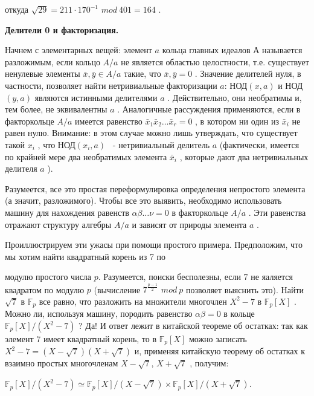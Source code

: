 \documentclass{mai_book}
\begin{document}
откуда $\sqrt{29}=211\cdot 170^{-1}$ $mod \ 401=164$
.


{\bf Делители 0 и факторизация.}

Начнем с элементарных вещей: элемент $a$
 кольца главных идеалов $А$ называется разложимым, если кольцо $A/a$
 не является областью целостности, т.е. существует ненулевые элементы $\bar x,\bar y\in A/ a$
 такие, что $\bar x,\bar y = 0$
 . Значение делителей нуля, в частности, позволяет найти нетривиальные факторизации $a$: НОД$(x,a)$
 и НОД$(y,a)$
 являются истинными делителями $a$
 . Действительно, они необратимы и, тем более, не эквивалентны $a$
. Аналогичные рассуждения применяются, если в факторкольце $A/a$
 имеется равенство $\bar x_1\bar x_2\ldots \bar x_r = 0$
 , в котором ни один из $\bar x_i$
 не равен нулю. Внимание: в этом случае можно лишь утверждать, что существует такой $x_i$
 , что НОД$(x_i,a)$
 ~- нетривиальный делитель $a$
 (фактически, имеется по крайней мере два необратимых элемента $\bar x_i$
    , которые дают два нетривиальных делителя $a$
).

Разумеется, все это простая переформулировка определения непростого элемента (а значит, разложимого). Чтобы все это выявить, необходимо использовать машину для нахождения равенств $\alpha\beta\ldots\nu=0$
 в факторкольце $A/a$
 . Эти равенства отражают структуру алгебры $A/a$
 и зависят от природы элемента $a$
 .

Проиллюстрируем эти ужасы при помощи простого примера. Предположим, что мы хотим найти квадратный корень из 7 по

\newpage

модулю простого числа $p$. Разумеется, поиски бесполезны, если 7 не яаляется квадратом по модулю $p$ (вычисление $7^{\frac{p-1}{2}}$ $mod \ p$
 позволяет выяснить это). Найти $\sqrt 7$
 в $\mathbb{F}_p$
 все равно, что разложить на множители многочлен $X^2 - 7$
 в $\mathbb{F}_p[X]$
 . Можно ли, используя машину, породить равенство $\alpha\beta=0$
 в кольце $\mathbb{F}_p[X]/(X^2 - 7)$
 ? Да! И ответ лежит в китайской теореме об остатках: так как элемент 7 имеет квадратный корень, то в $\mathbb{F}_p[X]$
 можно записать $X^2 - 7 = (X-\sqrt 7)(X+\sqrt 7)$
 и, применяя китайскую теорему об остатках к взаимно простых многочленам $X - \sqrt 7$, $X+\sqrt 7$
 , получим:

\begin{center}
$\mathbb{F}_p[X]/(X^2 - 7)\simeq \mathbb{F}_p[X]/(X-\sqrt 7)\times\mathbb{F}_p[X]/(X+\sqrt 7)$.
\end{center}
\end{document}
